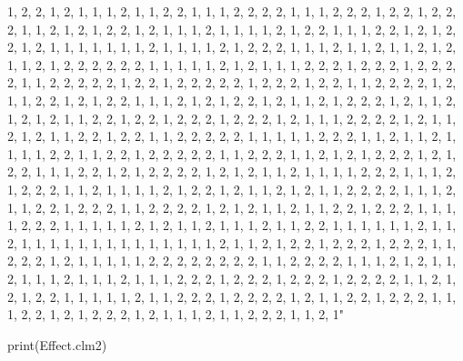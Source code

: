 \documentclass[
]{article}
\begin{document}
\begin{Schunk}
\begin{Soutput}
1, 2, 2, 1, 2, 1, 1, 1, 2, 1, 1, 2, 2, 1, 1, 1, 2, 2, 2, 2, 1, 1, 1, 2, 2, 2, 1, 2, 2, 1, 2, 2, 2, 1, 1, 2, 1, 2, 1, 2, 2, 1, 2, 1, 1, 1, 2, 1, 1, 1, 1, 2, 1, 2, 2, 1, 1, 1, 2, 2, 1, 2, 1, 2, 2, 1, 2, 1, 1, 1, 1, 1, 1, 1, 2, 1, 1, 1, 1, 2, 1, 2, 2, 2, 1, 1, 1, 2, 1, 1, 2, 1, 1, 2, 1, 2, 1, 1, 2, 1, 2, 2, 2, 2, 2, 2, 1, 1, 1, 1, 1, 2, 1, 2, 1, 1, 1, 2, 2, 2, 1, 2, 2, 2, 1, 2, 2, 2, 2, 1, 1, 2, 2, 2, 2, 2, 1, 2, 2, 1, 2, 2, 2, 2, 2, 1, 2, 2, 2, 1, 2, 2, 1, 1, 2, 2, 2, 2, 1, 2, 1, 1, 2, 2, 1, 2, 1, 2, 2, 1, 1, 1, 2, 1, 2, 1, 2, 2, 1, 2, 1, 1, 2, 1, 2, 2, 2, 1, 2, 1, 1, 2, 1, 2, 1, 2, 1, 1, 2, 2, 1, 2, 2, 1, 2, 2, 2, 1, 2, 2, 2, 1, 2, 1, 1, 1, 2, 2, 2, 2, 1, 2, 1, 1, 2, 1, 2, 1, 1, 2, 2, 1, 2, 2, 1, 1, 2, 2, 2, 2, 2, 1, 1, 1, 1, 1, 2, 2, 2, 1, 1, 2, 1, 1, 2, 1, 1, 1, 1, 2, 2, 1, 1, 2, 2, 1, 2, 2, 2, 2, 2, 1, 1, 2, 2, 2, 1, 1, 2, 1, 2, 1, 2, 2, 2, 1, 2, 1, 2, 2, 1, 1, 1, 2, 2, 1, 2, 1, 2, 2, 2, 2, 1, 2, 1, 2, 1, 1, 2, 1, 1, 1, 1, 2, 2, 2, 1, 1, 1, 2, 1, 2, 2, 2, 1, 1, 2, 1, 1, 1, 1, 2, 1, 2, 2, 1, 2, 1, 1, 2, 1, 2, 1, 1, 2, 2, 2, 2, 1, 1, 1, 2, 1, 1, 2, 2, 1, 2, 2, 2, 1, 1, 2, 2, 2, 2, 1, 2, 1, 2, 1, 1, 2, 1, 1, 2, 2, 1, 2, 2, 2, 1, 1, 1, 1, 2, 2, 2, 1, 1, 1, 1, 1, 2, 1, 2, 1, 1, 2, 1, 1, 1, 2, 1, 1, 2, 2, 1, 1, 1, 1, 1, 1, 2, 1, 1, 2, 1, 1, 1, 1, 1, 1, 1, 1, 1, 1, 1, 1, 1, 1, 2, 1, 1, 2, 1, 2, 2, 1, 2, 2, 2, 1, 2, 2, 2, 1, 1, 2, 2, 2, 1, 2, 1, 1, 1, 1, 1, 2, 2, 2, 2, 2, 2, 2, 2, 1, 1, 2, 2, 2, 2, 1, 1, 1, 2, 1, 2, 1, 1, 2, 1, 1, 1, 2, 1, 1, 1, 2, 1, 1, 1, 2, 2, 2, 1, 2, 2, 2, 1, 2, 2, 2, 1, 2, 2, 2, 2, 1, 1, 2, 1, 2, 1, 2, 2, 1, 1, 1, 1, 1, 2, 1, 1, 2, 2, 2, 1, 2, 2, 2, 2, 1, 2, 1, 1, 2, 2, 1, 2, 2, 2, 1, 1, 1, 2, 2, 1, 2, 1, 2, 2, 2, 1, 2, 1, 1, 1, 2, 1, 1, 2, 2, 2, 1, 1, 2, 1" 
\end{Soutput}
\end{Schunk}
\begin{Schunk}
\begin{Sinput}
 print(Effect.clm2)
\end{Sinput}
\end{Schunk}
\end{document}
